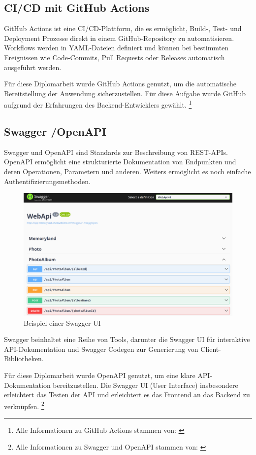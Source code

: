 \subsection{CI/CD mit GitHub Actions}

GitHub Actions ist eine CI/CD-Plattform, die es ermöglicht, Build-, Test- und 
Deployment Prozesse direkt in einem GitHub-Repository zu automatisieren. Workflows 
werden in YAML-Dateien definiert und können bei bestimmten Ereignissen wie 
Code-Commits, Pull Requests oder Releases automatisch ausgeführt werden.

Für diese Diplomarbeit wurde GitHub Actions genutzt, um die automatische Bereitstellung 
der Anwendung sicherzustellen. Für diese Aufgabe wurde GitHub aufgrund der Erfahrungen
des Backend-Entwicklers gewählt.
\footnote{Alle Informationen zu GitHub Actions stammen von: \cite{GitHuba}}


\subsection{Swagger \slash OpenAPI}

Swagger und OpenAPI sind Standards zur Beschreibung von REST-APIs. OpenAPI ermöglicht 
eine strukturierte Dokumentation von Endpunkten und deren Operationen, Parametern und
anderen. Weiters ermöglicht es noch einfache Authentifizierungsmethoden.

\begin{figure} [h t]
    \centering
    \includegraphics[scale=0.15]{pics/swagger-ui-example.png}
    \caption{Beispiel einer Swagger-UI}
    \label{fig:swagger-ui-example}
\end{figure}

Swagger beinhaltet eine Reihe von Tools, darunter die Swagger UI für interaktive 
API-Dokumentation und Swagger Codegen zur Generierung von Client-Bibliotheken.

Für diese Diplomarbeit wurde OpenAPI genutzt, um eine klare API-Dokumentation bereitzustellen. 
Die Swagger UI (User Interface) insbesondere erleichtert das Testen der API und erleichtert 
es das Frontend an das Backend zu verknüpfen.
\footnote{Alle Informationen zu Swagger und OpenAPI stammen von: \cite{SmartBearSoftware}}

